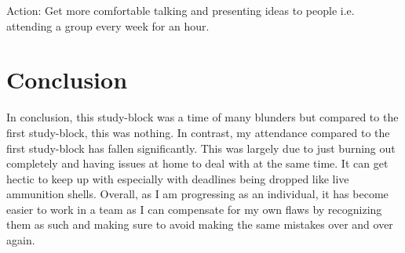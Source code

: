 \documentclass{scrartcl}
\begin{document}
Action: Get more comfortable talking and presenting ideas to people i.e. attending a group every week for an hour. 


\section{Conclusion}
In conclusion, this study-block was a time of many blunders but compared to the first study-block, this was nothing. In contrast, my attendance compared to the first study-block has fallen significantly. This was largely due to just burning out completely and having issues at home to deal with at the same time. It can get hectic to keep up with especially with deadlines being dropped like live ammunition shells. Overall, as I am progressing as an individual, it has become easier to work in a team as I can compensate for my own flaws by recognizing them as such and making sure to avoid making the same mistakes over and over again.
\end{document}
